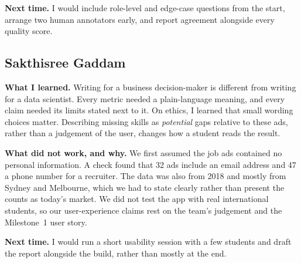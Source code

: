 \textbf{Next time.} I would include role-level and edge-case questions from the start, arrange two human annotators early, and report agreement alongside every quality score.

\subsection{Sakthisree Gaddam}
\textbf{What I learned.} Writing for a business decision-maker is different from writing for a data scientist. Every metric needed a plain-language meaning, and every claim needed its limits stated next to it. On ethics, I learned that small wording choices matter. Describing missing skills as \emph{potential} gaps relative to these ads, rather than a judgement of the user, changes how a student reads the result.

\textbf{What did not work, and why.} We first assumed the job ads contained no personal information. A check found that 32 ads include an email address and 47 a phone number for a recruiter. The data was also from 2018 and mostly from Sydney and Melbourne, which we had to state clearly rather than present the counts as today's market. We did not test the app with real international students, so our user-experience claims rest on the team's judgement and the Milestone~1 user story.

\textbf{Next time.} I would run a short usability session with a few students and draft the report alongside the build, rather than mostly at the end.
